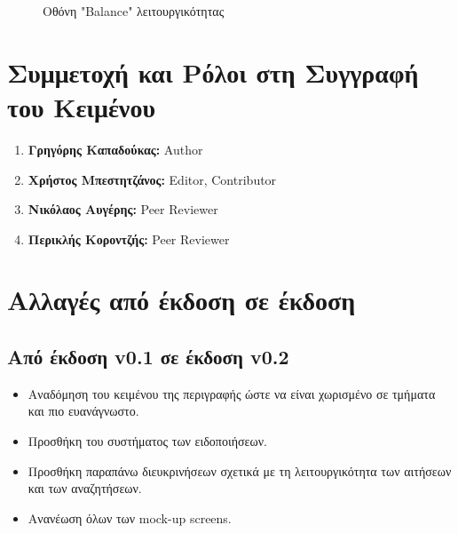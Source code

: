 \documentclass[12pt,a4paper]{article}
\begin{document}
\begin{figure}[H]
	\caption{Οθόνη "Balance" λειτουργικότητας}
	\label{Οθόνη "Balance" λειτουργικότητας}
\end{figure}

\section{Συμμετοχή και Ρόλοι στη Συγγραφή του Κειμένου}

\begin{enumerate}
	\item \textbf{Γρηγόρης Καπαδούκας:} Author
	\item \textbf{Χρήστος Μπεστητζάνος:} Editor, Contributor
	\item \textbf{Νικόλαος Αυγέρης:} Peer Reviewer
	\item \textbf{Περικλής Κοροντζής:} Peer Reviewer
\end{enumerate}

\section{Αλλαγές από έκδοση σε έκδοση}

\subsection{Από έκδοση v0.1 σε έκδοση v0.2}
\begin{itemize}
    \item Αναδόμηση του κειμένου της περιγραφής ώστε να είναι χωρισμένο σε τμήματα και πιο ευανάγνωστο. 
    \item Προσθήκη του συστήματος των ειδοποιήσεων.
    \item Προσθήκη παραπάνω διευκρινήσεων σχετικά με τη λειτουργικότητα των αιτήσεων και των αναζητήσεων.
    \item Ανανέωση όλων των mock-up screens.
\end{itemize}
\end{document}
